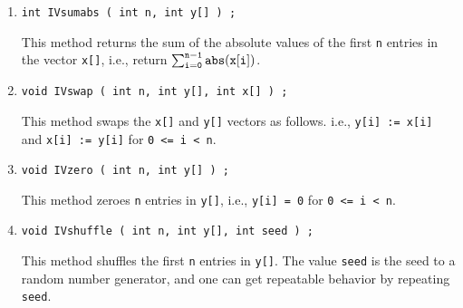 \begin{enumerate}
\item
\begin{verbatim}
int IVsumabs ( int n, int y[] ) ;
\end{verbatim}
This method returns the sum of the absolute values of the 
first {\tt n} entries in the vector {\tt x[]},
i.e., return
$\sum_{\tt i = 0}^{\tt n-1} {\tt abs(x[i])}$.
\item
\begin{verbatim}
void IVswap ( int n, int y[], int x[] ) ;
\end{verbatim}
This method swaps the {\tt x[]} and {\tt y[]} vectors as follows.
i.e.,
{\tt y[i] := x[i]} and
{\tt x[i] := y[i]} 
for {\tt 0 <= i < n}.
\item
\begin{verbatim}
void IVzero ( int n, int y[] ) ;
\end{verbatim}
This method zeroes {\tt n} entries in {\tt y[]},
i.e.,
{\tt y[i] = 0} 
for {\tt 0 <= i < n}.
\item
\begin{verbatim}
void IVshuffle ( int n, int y[], int seed ) ;
\end{verbatim}
This method shuffles the first {\tt n} entries in {\tt y[]}.
The value {\tt seed} is the seed to a random number generator,
and one can get repeatable behavior by repeating {\tt seed}.
\end{enumerate}
